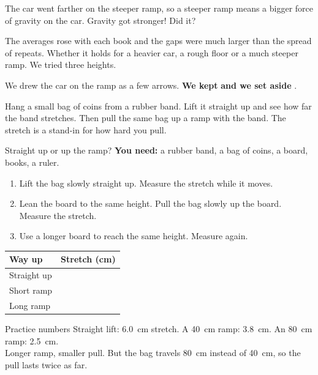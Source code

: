 \begin{multix}[hmm]\multixbot[hmm]\tcblower
The car went farther on the steeper ramp, so a steeper ramp means a bigger force of gravity on the car. Gravity got stronger! Did it?
\end{multix}

{The averages rose with each book and the gaps were much larger than the spread of repeats.}
{Whether it holds for a heavier car, a rough floor or a much steeper ramp. We tried three heights.}

\begin{keepbox}
We drew the car on the ramp as a few arrows. \textbf{We kept} \wline[3.4cm] \textbf{and we set aside} \wline[3.4cm].
\end{keepbox}

\clearpage

Hang a small bag of coins from a rubber band. Lift it straight up and see how far the band stretches. Then pull the same bag up a ramp with the band. The stretch is a stand-in for how hard you pull.

\begin{tryit}{Straight up or up the ramp?}
\textbf{You need:} a rubber band, a bag of coins, a board, books, a ruler.
\begin{enumerate}[leftmargin=1.6em]
\item Lift the bag slowly straight up. Measure the stretch while it moves.
\item Lean the board to the same height. Pull the bag slowly up the board. Measure the stretch.
\item Use a longer board to reach the same height. Measure again.
\end{enumerate}
\par\medskip
\renewcommand{\arraystretch}{1.6}
\begin{tabular}{|l|c|}
\hline
\textbf{Way up} & \textbf{Stretch (cm)}\\ \hline
Straight up & \\ \hline
Short ramp & \\ \hline
Long ramp & \\ \hline
\end{tabular}
\end{tryit}

\begin{worked}{Practice numbers}
Straight lift: 6.0~cm stretch. A 40~cm ramp: 3.8~cm. An 80~cm ramp: 2.5~cm.\\
Longer ramp, smaller pull. But the bag travels 80~cm instead of 40~cm, so the pull lasts twice as far.
\end{worked}

